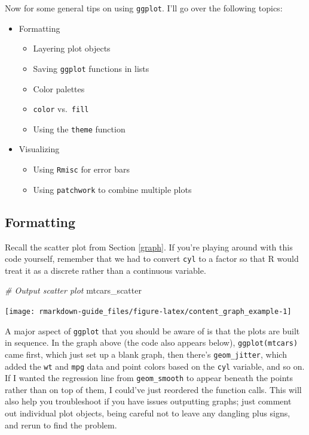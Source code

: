 \documentclass[
  openany]{book}
\newenvironment{Shaded}{\begin{snugshade}}{\end{snugshade}}
\newcommand{\CommentTok}[1]{\textcolor[rgb]{0.56,0.35,0.01}{\textit{#1}}}
\newcommand{\NormalTok}[1]{#1}
\providecommand{\tightlist}{%
  \setlength{\itemsep}{0pt}\setlength{\parskip}{0pt}}
\begin{document}
Now for some general tips on using \texttt{ggplot}. I'll go over the following topics:

\begin{itemize}
\tightlist
\item
  Formatting

  \begin{itemize}
  \tightlist
  \item
    Layering plot objects
  \item
    Saving \texttt{ggplot} functions in lists
  \item
    Color palettes
  \item
    \texttt{color} vs.~\texttt{fill}
  \item
    Using the \texttt{theme} function
  \end{itemize}
\item
  Visualizing

  \begin{itemize}
  \tightlist
  \item
    Using \texttt{Rmisc} for error bars
  \item
    Using \texttt{patchwork} to combine multiple plots
  \end{itemize}
\end{itemize}

\hypertarget{formatting}{%
\subsection{Formatting}\label{formatting}}

Recall the scatter plot from Section \ref{graph}. If you're playing around with this code yourself, remember that we had to convert \texttt{cyl} to a factor so that R would treat it as a discrete rather than a continuous variable.

\begin{Shaded}
\begin{Highlighting}[]
\CommentTok{# Output scatter plot}
\NormalTok{mtcars_scatter}
\end{Highlighting}
\end{Shaded}

\texttt{[image: rmarkdown-guide\_files/figure-latex/content\_graph\_example-1]}

A major aspect of \texttt{ggplot} that you should be aware of is that the plots are built in sequence. In the graph above (the code also appears below), \texttt{ggplot(mtcars)} came first, which just set up a blank graph, then there's \texttt{geom\_jitter}, which added the \texttt{wt} and \texttt{mpg} data and point colors based on the \texttt{cyl} variable, and so on. If I wanted the regression line from \texttt{geom\_smooth} to appear beneath the points rather than on top of them, I could've just reordered the function calls. This will also help you troubleshoot if you have issues outputting graphs; just comment out individual plot objects, being careful not to leave any dangling plus signs, and rerun to find the problem.
\end{document}
